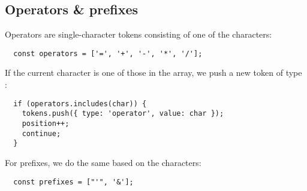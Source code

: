 \subsection{Operators \& prefixes}
Operators are single-character tokens consisting of one of the characters:
\begin{verbatim}
  const operators = ['=', '+', '-', '*', '/'];
\end{verbatim}

If the current character is one of those in the  array,
we push a new token of type :
\begin{verbatim}
  if (operators.includes(char)) {
    tokens.push({ type: 'operator', value: char });
    position++;
    continue;
  }
\end{verbatim}

For prefixes, we do the same based on the characters:
\begin{verbatim}
  const prefixes = ["'", '&'];
\end{verbatim}

